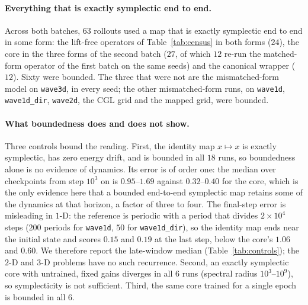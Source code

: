\documentclass[11pt]{article}
\theoremstyle{definition}
\theoremstyle{remark}
\begin{document}
\paragraph{Everything that is exactly symplectic end to end.} Across both
batches, $63$ rollouts used a map that is exactly symplectic end to end in some
form: the lift-free operators of Table~\ref{tab:census} in both forms ($24$), the
core in the three forms of the second batch ($27$, of which $12$ re-run the
matched-form operator of the first batch on the same seeds) and the canonical
wrapper ($12$). Sixty were bounded.
The three that were not are the mismatched-form model on \texttt{wave3d}, in
every seed; the other mismatched-form runs, on \texttt{wave1d},
\texttt{wave1d\_dir}, \texttt{wave2d}, the CGL grid and the mapped grid, were
bounded.

\paragraph{What boundedness does and does not show.} Three controls bound the
reading. First, the identity map $x\mapsto x$ is exactly symplectic, has zero
energy drift, and is bounded in all $18$ runs, so boundedness alone is no
evidence of dynamics. Its error is of order one: the median over checkpoints
from step $10^{3}$ on is $0.95$--$1.69$ against $0.32$--$0.40$ for the core,
which is the only evidence here that a bounded end-to-end symplectic map retains
some of the dynamics at that horizon, a factor of three to four. The final-step
error is misleading in $1$-D: the reference is periodic with a period that
divides $2\times10^{4}$ steps ($200$ periods for \texttt{wave1d}, $50$ for
\texttt{wave1d\_dir}), so the identity map ends near the initial state and scores
$0.15$ and $0.19$ at the last step, below the core's $1.06$ and $0.60$. We
therefore report the late-window median (Table~\ref{tab:controls}); the
$2$-D and $3$-D problems have no such recurrence. Second, an exactly symplectic
core with untrained, fixed gains diverges in all $6$ runs (spectral radius
$10^{3}$--$10^{9}$), so symplecticity is not sufficient. Third, the same core
trained for a single epoch is bounded in all $6$.
\end{document}
